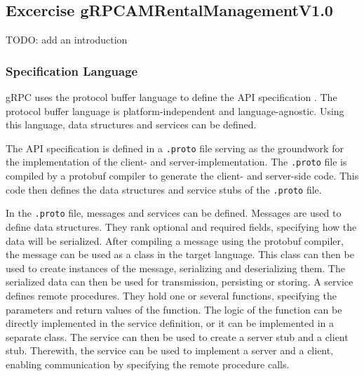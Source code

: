 \subsection{Excercise gRPCAMRentalManagementV1.0}
TODO: add an introduction

\subsubsection*{Specification Language}
gRPC uses the protocol buffer language to define the API specification \cite{PRO-DOC}.
The protocol buffer language is platform-independent and language-agnostic.
Using this language, data structures and services can be defined.

The API specification is defined in a \texttt{.proto} file serving as the groundwork for the implementation of the client- and server-implementation.
The \texttt{.proto} file is compiled by a protobuf compiler to generate the client- and server-side code.
This code then defines the data structures and service stubs of the \texttt{.proto} file.

In the \texttt{.proto} file, messages and services can be defined.
Messages are used to define data structures.
They rank optional and required fields, specifying how the data will be serialized.
After compiling a message using the protobuf compiler, the message can be used as a class in the target language.
This class can then be used to create instances of the message, serializing and deserializing them.
The serialized data can then be used for transmission, persisting or storing.
A service defines remote procedures.
They hold one or several functions, specifying the parameters and return values of the function.
The logic of the function can be directly implemented in the service definition, or it can be implemented in a separate class.
The service can then be used to create a server stub and a client stub.
Therewith, the service can be used to implement a server and a client, enabling communication by specifying the remote procedure calls.

